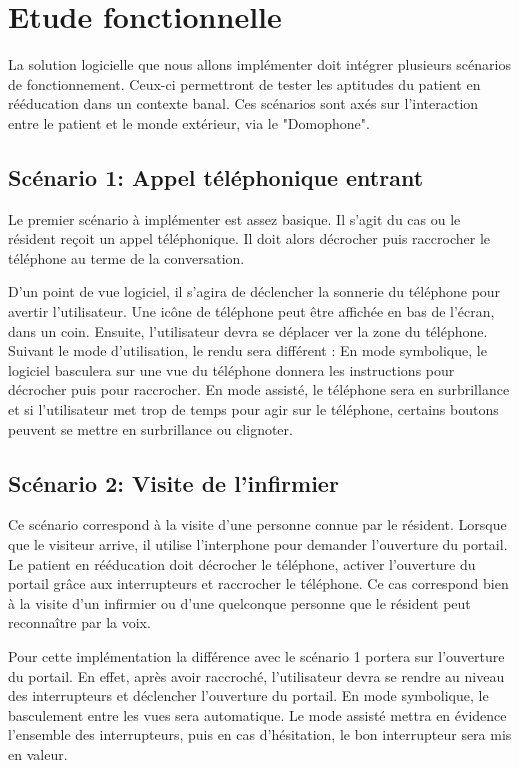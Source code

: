 

\section{Etude fonctionnelle}

La solution logicielle que nous allons implémenter doit intégrer plusieurs scénarios de fonctionnement. Ceux-ci permettront de tester les aptitudes du patient en rééducation dans un contexte banal. Ces scénarios sont axés sur l'interaction entre le patient et le monde extérieur, via le "Domophone". 

\subsection{Scénario 1: Appel téléphonique entrant}

Le premier scénario à implémenter est assez basique. Il s'agit du cas ou le résident reçoit un appel téléphonique. Il doit alors décrocher puis raccrocher le téléphone au terme de la conversation.

D'un point de vue logiciel, il s'agira de déclencher la sonnerie du téléphone pour avertir l'utilisateur. Une icône de téléphone peut être affichée en bas de l'écran, dans un coin. Ensuite, l'utilisateur devra se déplacer ver la zone du téléphone. Suivant le mode d'utilisation, le rendu sera différent : En mode symbolique, le logiciel basculera sur une vue du téléphone donnera les instructions pour décrocher puis pour raccrocher. En mode assisté, le téléphone sera en surbrillance et si l'utilisateur met trop de temps pour agir sur le téléphone, certains boutons peuvent se mettre en surbrillance ou clignoter.

\subsection{Scénario 2: Visite de l'infirmier}

Ce scénario correspond à la visite d'une personne connue par le résident. Lorsque que le visiteur arrive, il utilise l'interphone pour demander l'ouverture du portail. Le patient en rééducation doit décrocher le téléphone, activer l'ouverture du portail grâce aux interrupteurs et raccrocher le téléphone. Ce cas correspond bien à la visite d'un infirmier ou d'une quelconque personne que le résident peut reconnaître par la voix. 

Pour cette implémentation la différence avec le scénario 1 portera sur l'ouverture du portail. En effet, après avoir raccroché, l'utilisateur devra se rendre au niveau des interrupteurs et déclencher l'ouverture du portail. En mode symbolique, le basculement entre les vues sera automatique. Le mode assisté mettra en évidence l'ensemble des interrupteurs, puis en cas d'hésitation, le bon interrupteur sera mis en valeur.


